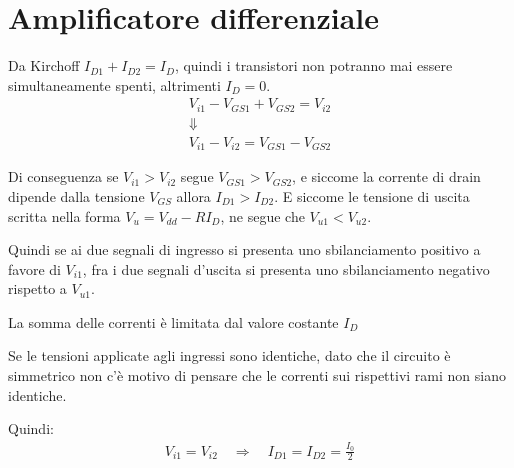 \documentclass[../template]{subfiles}
\begin{document}
\section{Amplificatore differenziale}
\begin{center}
\end{center}


Da Kirchoff $I_{D1} + I_{D2} = I_D$, quindi i transistori non potranno mai essere simultaneamente spenti, altrimenti $I_D = 0$.
\begin{gather*}
    V_{i1} - V_{GS1} + V_{GS2} = V_{i2}\\
    \Downarrow\\
    V_{i1} - V_{i2} =  V_{GS1} - V_{GS2}
\end{gather*}

Di conseguenza se $V_{i1} > V_{i2}$ segue $V_{GS1} > V_{GS2}$, e siccome la corrente di drain dipende dalla tensione $V_{GS}$
allora $I_{D1} > I_{D2}$.
E siccome le tensione di uscita scritta nella forma $V_u = V_{dd} - R I_D$, ne segue che $V_{u1} < V_{u2}$.

Quindi se ai due segnali di ingresso si presenta uno sbilanciamento positivo a favore di $V_{i1}$, fra i due segnali d'uscita
si presenta uno sbilanciamento negativo rispetto a $V_{u1}$.

La somma delle correnti è limitata dal valore costante $I_D$

Se le tensioni applicate agli ingressi sono identiche, dato che il circuito è simmetrico non c'è motivo di pensare che
le correnti sui rispettivi rami non siano identiche.

Quindi:
\begin{align*}
    V_{i1} = V_{i2} \quad \Rightarrow \quad I_{D1} = I_{D2} = \frac{I_0}{2}
\end{align*}
\end{document}
